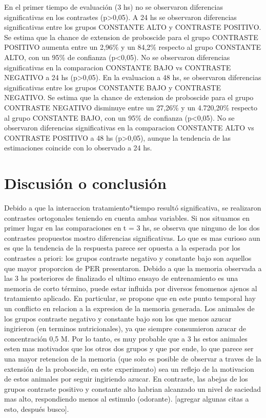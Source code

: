 \documentclass[
]{article}
\begin{document}
En el primer tiempo de evaluación (3 hs) no se observaron diferencias
significativas en los contrastes (p\textgreater0,05). A 24 hs se
observaron diferencias significativas entre los grupos CONSTANTE ALTO y
CONTRASTE POSITIVO. Se estima que la chance de extension de proboscide
para el grupo CONTRASTE POSITIVO aumenta entre un 2,96\% y un 84,2\%
respecto al grupo CONSTANTE ALTO, con un 95\% de confianza
(p\textless0,05). No se observaron diferencias significativas en la
comparacion CONSTANTE BAJO vs CONTRASTE NEGATIVO a 24 hs
(p\textgreater0,05). En la evaluacion a 48 hs, se observaron diferencias
significativas entre los grupos CONSTANTE BAJO y CONTRASTE NEGATIVO. Se
estima que la chance de extension de proboscide para el grupo CONTRASTE
NEGATIVO disminuye entre un 27,26\% y un 4.720,20\% respecto al grupo
CONSTANTE BAJO, con un 95\% de confianza (p\textless0,05). No se
observaron diferencias significativas en la comparacion CONSTANTE ALTO
vs CONTRASTE POSITIVO a 48 hs (p\textgreater0,05), aunque la tendencia
de las estimaciones coincide con lo observado a 24 hs.

\hypertarget{discusiuxf3n-o-conclusiuxf3n}{%
\section{Discusión o conclusión}\label{discusiuxf3n-o-conclusiuxf3n}}

Debido a que la interaccion tratamiento*tiempo resultó significativa, se
realizaron contrastes ortogonales teniendo en cuenta ambas variables. Si
nos situamos en primer lugar en las comparaciones en t = 3 hs, se
observa que ninguno de los dos contrastes propuestos mostro diferencias
significativas. Lo que es mas curioso aun es que la tendencia de la
respuesta parece ser opuesta a la esperada por los contrastes a priori:
los grupos contraste negativo y constante bajo son aquellos que mayor
proporcion de PER presentaron. Debido a que la memoria observada a las 3
hs posteriores de finalizado el ultimo ensayo de entrenamiento es una
memoria de corto término, puede estar influida por diversos fenomenos
ajenos al tratamiento aplicado. En particular, se propone que en este
punto temporal hay un conflicto en relacion a la expresion de la memoria
generada. Los animales de los grupos contraste negativo y constante bajo
son los que menos azucar ingirieron (en terminos nutricionales), ya que
siempre consumieron azucar de concentración 0,5 M. Por lo tanto, es muy
probable que a 3 hs estos animales esten mas motivados que los otros dos
grupos y que por ende, lo que parece ser una mayor retencion de la
memoria (que solo es posible de observar a traves de la extensión de la
proboscide, en este experimento) sea un reflejo de la motivacion de
estos animales por seguir ingiriendo azucar. En contraste, las abejas de
los grupos contraste positivo y constante alto habrian alcanzado un
nivel de saciedad mas alto, respondiendo menos al estimulo (odorante).
{[}agregar algunas citas a esto, después busco{]}.
\end{document}
